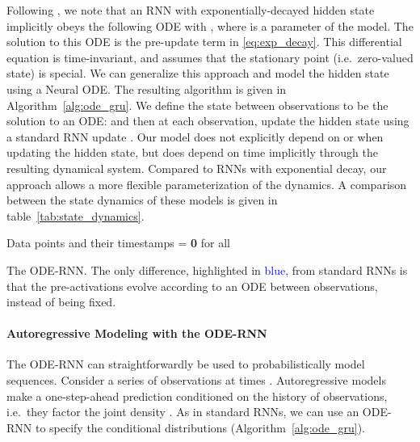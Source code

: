 \documentclass{article}
\begin{document}
Following \citet{mozer_2017}, we note that an RNN with exponentially-decayed hidden state implicitly obeys the following ODE  with ,
where  is a parameter of the model.
The solution to this ODE is the pre-update term  in \eqref{eq:exp_decay}.
This differential equation is time-invariant, and assumes that the stationary point (i.e.\ zero-valued state) is special.
We can generalize this approach and model the hidden state using a Neural ODE.
The resulting algorithm is given in Algorithm~\ref{alg:ode_gru}.
We define the state between observations to be the solution to an ODE:  and then at each observation, update the hidden state using a standard RNN update .
Our model does not explicitly depend on  or  when updating the hidden state, but does depend on time implicitly through the resulting dynamical system.
Compared to RNNs with exponential decay, our approach allows a more flexible parameterization of the dynamics.
A comparison between the state dynamics of these models is given in table~\ref{tab:state_dynamics}.






\begin{algorithm}
\begin{algorithmic}
	 Data points and their timestamps 
	\State  = \textbf{0}
    \State \textcolor{blue}{} 
	\State  {}
	\EndFor
	\State  for all 
	\end{algorithmic}
	\caption{The ODE-RNN.  The only difference, highlighted in \textcolor{blue}{blue}, from standard RNNs is that the pre-activations  evolve according to an ODE between observations, instead of being fixed.}
	\label{alg:ode_gru}
\end{algorithm}

\paragraph{Autoregressive Modeling with the ODE-RNN}
The ODE-RNN can straightforwardly be used to probabilistically model sequences.
Consider a series of observations  at times . Autoregressive models make a one-step-ahead prediction conditioned on the history of observations, i.e.\ they factor the joint density .
As in standard RNNs, we can use an ODE-RNN to specify the conditional distributions  (Algorithm~\ref{alg:ode_gru}).
\end{document}
